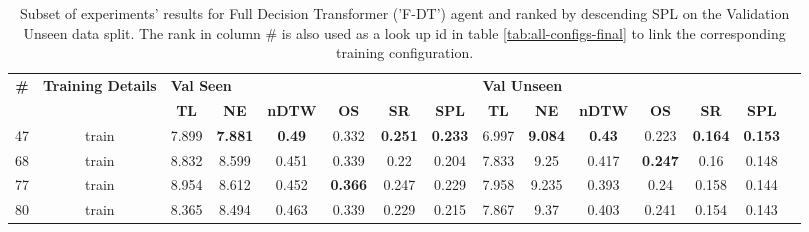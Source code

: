 \begin{table}
\centering
\caption{\label{tab:f_dt_full_dt_ablation_dim}Subset of experiments' results for Full Decision Transformer ('F-DT') agent and ranked by descending SPL on the Validation Unseen data split. The rank in column \# is also used as a look up id in table \ref{tab:all-configs-final} to link the corresponding training configuration.}
\begin{tabular}{@{\hskip3pt}c@{\hskip3pt}c@{\hskip3pt}c@{\hskip3pt}c@{\hskip3pt}c@{\hskip3pt}c@{\hskip3pt}c@{\hskip3pt}c@{\hskip3pt}c@{\hskip3pt}c@{\hskip3pt}c@{\hskip3pt}c@{\hskip3pt}c@{\hskip3pt}c@{\hskip3pt}c}
\toprule
\textbf{\#} & \textbf{Training Details} & \multicolumn{6}{l}{\textbf{Val Seen}} & \multicolumn{6}{l}{\textbf{Val Unseen}} \\
 \textbf{~} &                \textbf{~} &       \textbf{TL} &     \textbf{NE} &  \textbf{nDTW} &     \textbf{OS} &     \textbf{SR} &    \textbf{SPL} &         \textbf{TL} &     \textbf{NE} &  \textbf{nDTW} &     \textbf{OS} &     \textbf{SR} &    \textbf{SPL} \\
\midrule
         47 &                     train &             7.899 &  \textbf{7.881} &  \textbf{0.49} &           0.332 &  \textbf{0.251} &  \textbf{0.233} &               6.997 &  \textbf{9.084} &  \textbf{0.43} &           0.223 &  \textbf{0.164} &  \textbf{0.153} \\
         68 &                     train &             8.832 &           8.599 &          0.451 &           0.339 &            0.22 &           0.204 &               7.833 &            9.25 &          0.417 &  \textbf{0.247} &            0.16 &           0.148 \\
         77 &                     train &             8.954 &           8.612 &          0.452 &  \textbf{0.366} &           0.247 &           0.229 &               7.958 &           9.235 &          0.393 &            0.24 &           0.158 &           0.144 \\
         80 &                     train &             8.365 &           8.494 &          0.463 &           0.339 &           0.229 &           0.215 &               7.867 &            9.37 &          0.403 &           0.241 &           0.154 &           0.143 \\
\bottomrule
\end{tabular}
\end{table}
